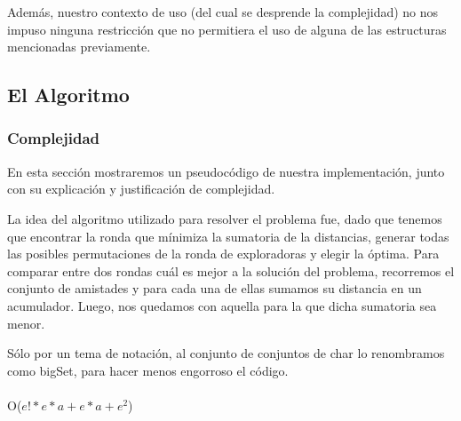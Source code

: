 \documentclass[11pt]{article}
\begin{document}
Además, nuestro contexto de uso (del cual se desprende la complejidad) no 
nos impuso ninguna restricción que no permitiera el uso de alguna de las estructuras mencionadas previamente.

\subsection{El Algoritmo}

\subsubsection{Complejidad}

En esta sección mostraremos un pseudocódigo de nuestra implementación, junto con su explicación y justificación
de complejidad.

La idea del algoritmo utilizado para resolver el problema fue, dado que tenemos que encontrar la ronda 
que mínimiza la sumatoria de la distancias, generar todas las posibles permutaciones de la ronda de exploradoras
y elegir la óptima. Para comparar entre dos rondas cuál es mejor a la solución del problema, 
recorremos el conjunto de amistades y para cada una de ellas sumamos su distancia en un acumulador. Luego, nos quedamos
con aquella para la que dicha sumatoria sea menor.

Sólo por un tema de notación, al conjunto de conjuntos de char lo renombramos como bigSet, para hacer menos 
engorroso el código.
\\ \\
\noindent\makebox[\linewidth]{\rule{17cm}{0.4pt}}
 {O($e!*e*a + e*a + e^2$)}
\end{document}
